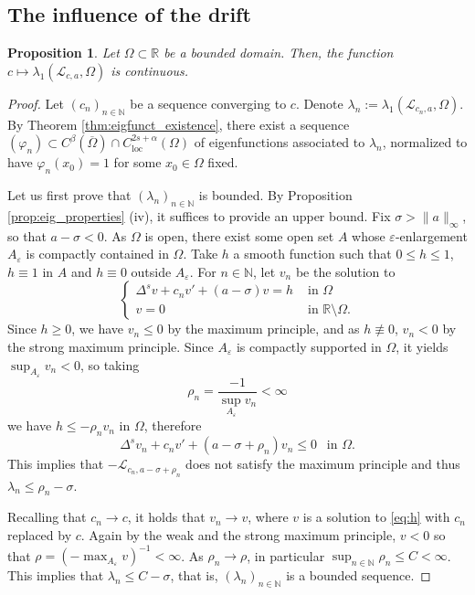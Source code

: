 \documentclass[11pt,a4paper]{amsart}
\newcommand{\Lop}{\mathcal{L}}
\newcommand{\R}{\mathbb{R}}
\newcommand{\inSet}[1]{\text{ in } {#1}}
\newcommand{\N}{\mathbb{N}}
\newcommand{\Cloc}{C_{\mathrm{loc}}}
\renewcommand{\phi}{\varphi}
\renewcommand{\epsilon}{\varepsilon}
\newtheorem{prop}[thm]{Proposition}
\begin{document}
\subsection{The influence of the drift}

\begin{prop}
\label{prop:continuity_drift}
Let $\Omega\subset \R$ be a bounded domain. Then, the function $c\mapsto \lambda_1(\Lop_{c,a}, \Omega)$ is continuous.
\end{prop}

\begin{proof}
Let $(c_n)_{n\in\N}$ be a sequence converging to $c$. Denote $\lambda_n := \lambda_1(\Lop_{c_n,a}, \Omega)$. By Theorem \ref{thm:eigfunct_existence}, there exist a sequence $(\phi_n) \subset C^{\beta}( \overline{\Omega}) \cap \Cloc^{2s+\alpha}(\Omega)$ of eigenfunctions associated to $\lambda_n$, normalized to have $\phi_n(x_0) = 1$ for some $x_0 \in \Omega$ fixed.

Let us first prove that $(\lambda_n)_{n\in\N}$ is bounded. By Proposition \ref{prop:eig_properties} (iv), it suffices to provide an upper bound. Fix $\sigma > \|a\|_{\infty}$, so that $a-\sigma < 0$. As $\Omega$ is open, there exist some open set $A$ whose $\epsilon$-enlargement $A_{\epsilon}$ is compactly contained in $\Omega$. Take $h$ a smooth function such that $ 0 \leq h \leq 1$, $h \equiv 1$ in $A$ and $h\equiv 0$ outside $A_{\epsilon}$. For $n\in \N$, let $v_n$ be the solution to
\begin{equation}
\label{eq:h}
\begin{cases}
\Delta^s v + c_nv' + (a - \sigma)v = h & \inSet{\Omega} \\
v = 0 & \text{ in } \R\setminus \Omega.
\end{cases}
\end{equation}
Since $h\geq 0$, we have $v_n \leq 0$ by the maximum principle, and as $h \not \equiv 0$, $v_n < 0$ by the strong maximum principle. Since $A_{\epsilon}$ is compactly supported in $\Omega$, it yields $\sup_{A_{\epsilon}} v_n < 0$, so taking 
\[\rho_n = \frac{-1}{\sup_{A_{\epsilon}} v_n} < \infty\]
we have $h \leq - \rho_n v_n$ in $\Omega$, therefore
\[\Delta^s v_n + c_n v' + (a - \sigma + \rho_n) v_n \leq 0 ~~ \text{ in }\Omega. \]
This implies that $-\Lop_{c_n, a-\sigma+\rho_n}$ does not satisfy the maximum principle and thus $\lambda_n \leq \rho_n - \sigma$.

Recalling that $c_n \rightarrow c$, it holds that $v_n\rightarrow v$, where $v$ is a solution to \eqref{eq:h} with $c_n$ replaced by $c$. Again by the weak and the strong maximum principle, $v < 0$ so that $\rho = (-\max_{A_{\epsilon}} v)^{-1} < \infty$. As $\rho_n \rightarrow \rho$, in particular $\sup_{n\in\N}\rho_n \leq C < \infty$. This implies that $\lambda_n \leq C -\sigma$, that is, $(\lambda_n)_{n\in\N}$ is a bounded sequence.


\end{proof}
\end{document}
